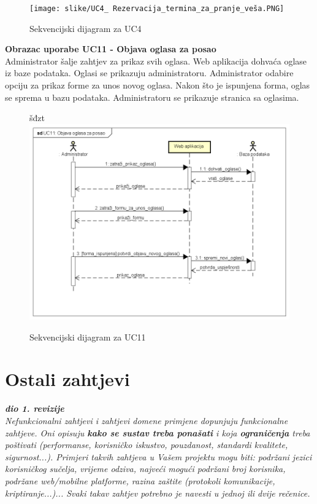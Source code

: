 \begin{figure}[H]
	\texttt{[image: slike/UC4\_ Rezervacija\_termina\_za\_pranje\_veša.PNG]} %
	\centering
	\caption{Sekvencijski dijagram za UC4}
	\label{fig:promjene}
\end{figure}
\eject


\textbf{Obrazac uporabe UC11 - Objava oglasa za posao} \\

Administrator šalje zahtjev za prikaz svih oglasa. Web aplikacija dohvaća oglase iz baze podataka. Oglasi se prikazuju administratoru. Administrator odabire opciju za prikaz forme za unos novog oglasa. Nakon što je ispunjena forma, oglas se sprema u bazu podataka. Administratoru se prikazuje stranica sa oglasima.

\begin{figure}[H]
šđzt
	\includegraphics[width=.9\linewidth]{slike/UC11_Objava_oglasa_za_posao.png}
	\centering
	\caption{Sekvencijski dijagram za UC11}
	\label{fig:skvDOglas}
\end{figure}
\eject

\section{Ostali zahtjevi}

\textbf{\textit{dio 1. revizije}}\\

\textit{Nefunkcionalni zahtjevi i zahtjevi domene primjene dopunjuju funkcionalne zahtjeve. Oni opisuju \textbf{kako se sustav treba ponašati} i koja \textbf{ograničenja} treba poštivati (performanse, korisničko iskustvo, pouzdanost, standardi kvalitete, sigurnost...). Primjeri takvih zahtjeva u Vašem projektu mogu biti: podržani jezici korisničkog sučelja, vrijeme odziva, najveći mogući podržani broj korisnika, podržane web/mobilne platforme, razina zaštite (protokoli komunikacije, kriptiranje...)... Svaki takav zahtjev potrebno je navesti u jednoj ili dvije rečenice.}

